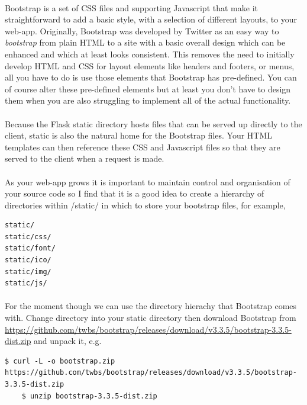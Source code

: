 \documentclass[12pt, a4paper, twoside]{book}
\begin{document}
\paragraph{} Bootstrap is a set of CSS files and supporting Javascript that make it straightforward to add a basic style, with a selection of different layouts, to your web-app. Originally, Bootstrap was developed by Twitter as an easy way to \emph{bootstrap} from plain HTML to a site with a basic overall design which can be enhanced and which at least looks consistent. This removes the need to initially develop HTML and CSS for layout elements like headers and footers, or menus, all you have to do is use those elements that Bootstrap has pre-defined. You can of course alter these pre-defined elements but at least you don't have to design them when you are also struggling to implement all of the actual functionality.

\paragraph{} Because the Flask static directory hosts files that can be served up directly to the client, static is also the natural home for the Bootstrap files. Your HTML templates can then reference these CSS and Javascript files so that they are served to the client when a request is made.

\paragraph{} As your web-app grows it is important to maintain control and organisation of your source code so I find that it is a good idea to create a hierarchy of directories within /static/ in which to store your bootstrap files, for example,

\begin{lstlisting}[style=DOS]
static/
static/css/
static/font/
static/ico/
static/img/
static/js/
\end{lstlisting}

\paragraph{} For the moment though we can use the directory hierachy that Bootstrap comes with. Change directory into your static directory  then download Bootstrap from \url{https://github.com/twbs/bootstrap/releases/download/v3.3.5/bootstrap-3.3.5-dist.zip} and unpack it, e.g.

\begin{lstlisting}[style=DOS]
    $ curl -L -o bootstrap.zip https://github.com/twbs/bootstrap/releases/download/v3.3.5/bootstrap-3.3.5-dist.zip
    $ unzip bootstrap-3.3.5-dist.zip
\end{lstlisting}
\end{document}
